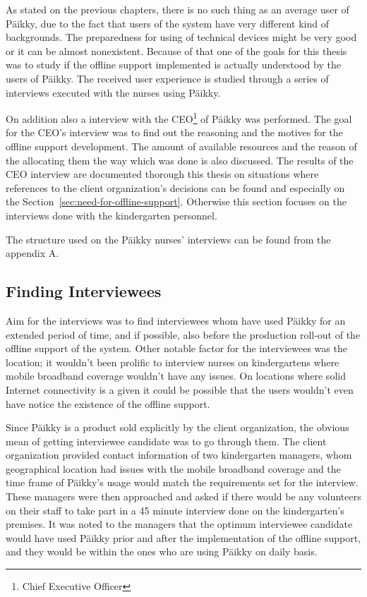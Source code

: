 As stated on the previous chapters, there is no such thing as an average user of Päikky, due to the fact that users of the system have very different kind of backgrounds. The preparedness for using of technical devices might be very good or it can be almost nonexistent. Because of that one of the goals for this thesis was to study if the offline support implemented is actually understood by the users of Päikky. The received user experience is studied through a series of interviews executed with the nurses using Päikky.

On addition also a interview with the CEO\footnote{Chief Executive Officer} of Päikky was performed. The goal for the CEO's interview was to find out the reasoning and the motives for the offline support development. The amount of available resources and the reason of the allocating them the way which was done is also discussed. The results of the CEO interview are documented thorough this thesis on situations where references to the client organization's decisions can be found and especially on the Section~\ref{sec:need-for-offline-support}. Otherwise this section focuses on the interviews done with the kindergarten personnel.

The structure used on the Päikky nurses' interviews can be found from the appendix A. %



\subsection{Finding Interviewees}

Aim for the interviews was to find interviewees whom have used Päikky for an extended period of time, and if possible, also before the production roll-out of the offline support of the system. Other notable factor for the interviewees was the location; it wouldn't been prolific to interview nurses on kindergartens where mobile broadband coverage wouldn't have any issues. On locations where solid Internet connectivity is a given it could be possible that the users wouldn't even have notice the existence of the offline support.

Since Päikky is a product sold explicitly by the client organization, the obvious mean of getting interviewee candidate was to go through them. The client organization provided contact information of two kindergarten managers, whom geographical location had issues with the mobile broadband coverage and the time frame of Päikky's usage would match the requirements set for the interview. These managers were then approached and asked if there would be any volunteers on their staff to take part in a 45 minute interview done on the kindergarten's premises. It was noted to the managers that the optimum interviewee candidate would have used Päikky prior and after the implementation of the offline support, and they would be within the ones who are using Päikky on daily basis.

